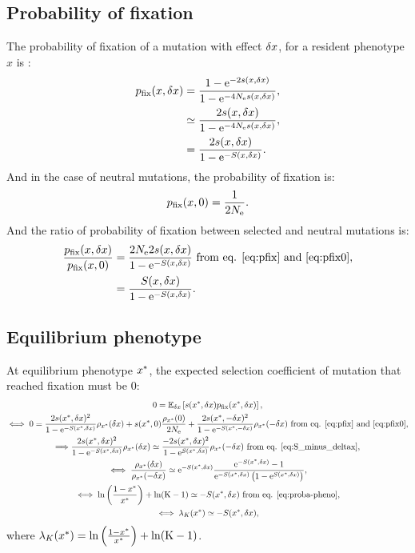 \subsection{Probability of fixation}
The probability of fixation of a mutation with effect $\delta x$, for a resident phenotype $x$ is :
\begin{align}
p_{\text{fix}}(x, \delta x) &= \frac{ 1 - \mathrm{e}^{-2 s(x, \delta x)}}{1 - \mathrm{e}^{-4N_{\mathrm{e}} s(x, \delta x)}}, \\
 &\simeq \frac{ 2 s(x, \delta x)}{1 - \mathrm{e}^{-4N_{\mathrm{e}} s(x, \delta x)}}, \\
 &= \frac{ 2 s(x, \delta x)}{1 - \mathrm{e}^{-S(x, \delta x)}}. \label{eq:pfix}
\end{align}
And in the case of neutral mutations, the probability of fixation is:
\begin{gather}
p_{\text{fix}}(x, 0) = \frac{ 1}{2 N_{\mathrm{e}}} \label{eq:pfix0}.
\end{gather}
And the ratio of probability of fixation between selected and neutral mutations is:
\begin{align}
\frac{p_{\text{fix}}(x, \delta x)}{p_{\text{fix}}(x, 0)} & = \frac{ 2 N_{\mathrm{e}} 2 s(x, \delta x)}{1 - \mathrm{e}^{-S(x, \delta x)}} \text{ from eq. \ref{eq:pfix} and \ref{eq:pfix0}},\\
& = \frac{S(x, \delta x)}{1 - \mathrm{e}^{-S(x, \delta x)}} \label{eq:pfixratio}.
\end{align}
\subsection{Equilibrium phenotype}
At equilibrium phenotype $x^{*}$, the expected selection coefficient of mutation that reached fixation must be $0$:
\begin{gather}
 0 = \operatorname{\mathbb{E}}_{\delta x} \left[ s(x^{*}, \delta x) p_{\text{fix}}(x^{*}, \delta x) \right], \\
\iff 0 = \frac{ 2 s(x^{*}, \delta x)^2}{1 - \mathrm{e}^{-S(x^{*}, \delta x)}}   \rho_{x^{*}}(\delta x) + s(x^{*}, 0) \frac{ \rho_{x^{*}}(0)}{2N_{\mathrm{e}}} + \frac{ 2s(x^{*}, -\delta x)^2}{1 - \mathrm{e}^{-S(x^{*}, -\delta x)}} \rho_{x^{*}}(-\delta x)\text{ from eq. \ref{eq:pfix} and \ref{eq:pfix0}}, \\
\Longrightarrow \frac{ 2s(x^{*}, \delta x)^2}{1 - \mathrm{e}^{-S(x^{*}, \delta x)}}   \rho_{x^{*}}(\delta x) \simeq \frac{ - 2s(x^{*}, \delta x)^2}{1 - \mathrm{e}^{S(x^{*}, \delta x)}}   \rho_{x^{*}}(-\delta x) \text{ from eq. \ref{eq:S_minus_deltax}}, \\
\iff \frac{ \rho_{x^{*}}(\delta x)}{\rho_{x^{*}}(-\delta x)} \simeq \mathrm{e}^{-S(x^{*}, \delta x)} \frac{ \mathrm{e}^{-S(x^{*}, \delta x)} - 1}{ \mathrm{e}^{-S(x^{*}, \delta x)} \left( 1 - \mathrm{e}^{S(x^{*}, \delta x)} \right)}, \\
\iff \ln \left( \frac{1 - x^{*}}{x^{*}} \right) + \ln (\text{K}-1) \simeq -S(x^{*}, \delta x) \text{ from eq. \ref{eq:proba-pheno}} \label{eq:equilibrium-pheno}, \\
\iff \lambda_{K}(x^{*}) \simeq -S(x^{*}, \delta x) \label{eq:equilibrium_lambda},
\end{gather}
where  $\lambda_{K}(x^{*}) = \ln \left( \frac{1 - x^{*}}{x^{*}} \right) + \ln (\text{K}-1)$.
